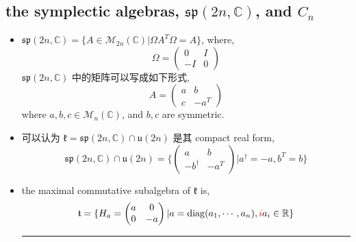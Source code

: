 \subsection{the symplectic algebras, \texorpdfstring{$\mathfrak{sp}(2 n, \mathbb{C})$}{sp(2 n, C)}, and \texorpdfstring{$C_n$}{C\_n}}
\begin{itemize}
	\item $\mathfrak{sp}(2 n, \mathbb{C}) = \{A \in \mathcal{M}_{2 n}(\mathbb{C}) | \Omega A^T \Omega = A\}$, where,
	\begin{equation}
		\Omega = \begin{pmatrix}
			0 & I \\
			- I & 0
		\end{pmatrix}
	\end{equation}
	$\mathfrak{sp}(2 n, \mathbb{C})$ 中的矩阵可以写成如下形式,
	\begin{equation}
		A = \begin{pmatrix}
			a & b \\
			c & - a^T
		\end{pmatrix}
	\end{equation}
	where $a, b, c \in \mathcal{M}_n(\mathbb{C})$, and $b, c$ are symmetric.
	
	\item 可以认为 $\mathfrak{k} = \mathfrak{sp}(2 n, \mathbb{C}) \cap \mathfrak{u}(2 n)$ 是其 compact real form,
	\begin{equation}
		\mathfrak{sp}(2 n, \mathbb{C}) \cap \mathfrak{u}(2 n) = \{\begin{pmatrix}
			a & b \\
			- b^\dag & - a^T
		\end{pmatrix} | a^\dag = - a, b^T = b\}
	\end{equation}
	
	\item the maximal commutative subalgebra of $\mathfrak{k}$ is,
	\begin{equation}
		\mathfrak{t} = \{H_a = \begin{pmatrix}
			a & 0 \\
			0 & - a
		\end{pmatrix} | a = \mathrm{diag}(a_1, \cdots, a_n), \mathcolor{red}{i} a_i \in \mathbb{R}\}
	\end{equation}
	
	\noindent\rule[0.5ex]{\linewidth}{0.5pt} %
	

\end{itemize}
